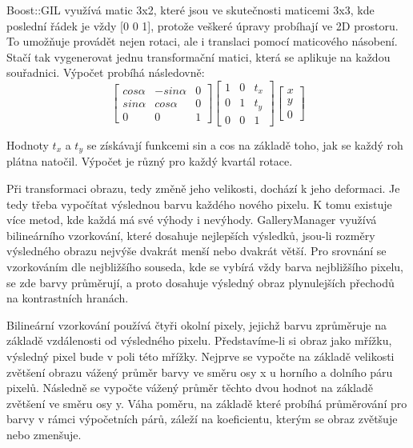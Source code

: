 \documentclass[11pt,twoside,a4paper]{book}
\begin{document}
\indent
Boost::GIL využívá matic 3x2, které jsou ve skutečnosti maticemi 3x3, kde poslední řádek je vždy [0 0 1], protože veškeré úpravy probíhají ve 2D prostoru. To umožňuje provádět nejen rotaci, ale i translaci pomocí maticového násobení. Stačí tak vygenerovat jednu transformační matici, která se aplikuje na každou souřadnici. Výpočet probíhá následovně:
$$
\begin{bmatrix}
cos\alpha & -sin\alpha & 0 \\
sin\alpha & cos\alpha & 0 \\
0 & 0 & 1
\end{bmatrix}
\begin{bmatrix}
1 & 0 & t_{x} \\
0 & 1 & t_{y} \\
0 & 0 & 1
\end{bmatrix}
\begin{bmatrix}
x \\
y \\
0
\end{bmatrix}
$$

\indent
Hodnoty $t_{x}$ a $t_{y}$ se získávají funkcemi sin a cos na základě toho, jak se každý roh plátna natočil. Výpočet je různý pro každý kvartál rotace.

\indent 
Při transformaci obrazu, tedy změně jeho velikosti, dochází k jeho deformaci. Je tedy třeba vypočítat výslednou barvu každého nového pixelu. K tomu existuje více metod, kde každá má své výhody i nevýhody. GalleryManager využívá bilineárního vzorkování, které dosahuje nejlepších výsledků, jsou-li rozměry výsledného obrazu nejvýše dvakrát menší nebo dvakrát větší. Pro srovnání se vzorkováním dle nejbližšího souseda, kde se vybírá vždy barva nejbližšího pixelu, se zde barvy průměrují, a proto dosahuje výsledný obraz plynulejších přechodů na kontrastních hranách.

\indent
Bilineární vzorkování používá čtyři okolní pixely, jejichž barvu zprůměruje na základě vzdálenosti od výsledného pixelu. Představíme-li si obraz jako mřížku, výsledný pixel bude v poli této mřížky. Nejprve se vypočte na základě velikosti zvětšení obrazu vážený průměr barvy ve směru osy x u horního a dolního páru pixelů. Následně se vypočte vážený průměr těchto dvou hodnot na základě zvětšení ve směru osy y. Váha poměru, na základě které probíhá průměrování pro barvy v rámci výpočetních párů, záleží na koeficientu, kterým se obraz zvětšuje nebo zmenšuje.


\end{document}
